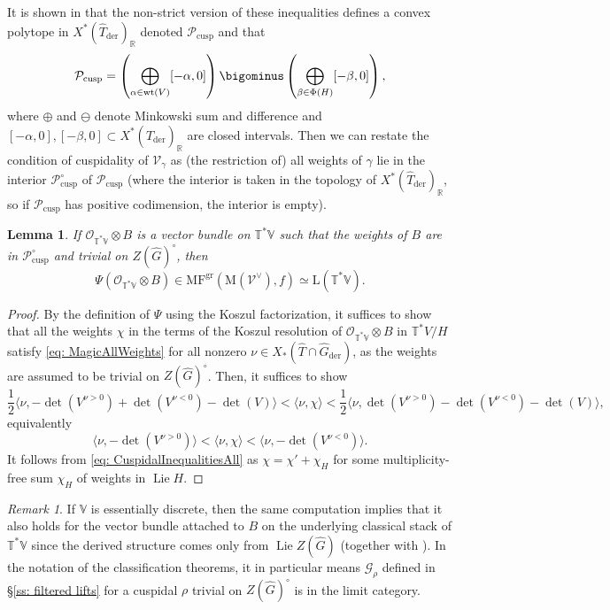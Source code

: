 \documentclass{amsart}
\newtheorem{lemma}[theorem]{Lemma}
\theoremstyle{definition}
\theoremstyle{remark}
\newtheorem{remark}[theorem]{Remark}
\numberwithin{equation}{section}
\DeclareMathOperator{\Lie}{Lie}
\newcommand{\der}{\mathrm{der}}
\newcommand{\mc}{\mathcal}
\newcommand{\R}{\mathbb{R}}
\newcommand{\wh}{\widehat}
\newcommand{\cusp}{\mathrm{cusp}}
\newcommand{\V}{\mathbb{V}}
\newcommand{\T}{\mathbb{T}}
\DeclareMathOperator{\gr}{gr}
\newcommand{\wt}{\mathrm{wt}}
\newcommand{\MF}{\mathrm{MF}}
\newcommand{\mrL}{\mathrm{L}}
\newcommand{\M}{\mathrm{M}}
\begin{document}
It is shown in \cite{BMKL} that the non-strict version of these inequalities defines a convex polytope in $X^{\ast}(\wh{T}_{\der})_{\R}$ denoted $\mc{P}_{\cusp}$ and that 
  \begin{equation*}
        \mc{P}_{\cusp} = \left(\bigoplus_{\alpha \in \wt(V)} [-\alpha, 0]\right) \bigominus \left(\bigoplus_{\beta \in \Phi(H)} [-\beta, 0]\right),
    \end{equation*}
where $\oplus$ and $\ominus$ denote Minkowski sum and difference and $[-\alpha,0], [-\beta, 0] \subset X^{\ast}(\wh{T}_{\der})_{\R}$ are closed intervals. Then we can restate the condition of cuspidality of $\mc{V}_{\gamma}$ as (the restriction of) all weights of $\gamma$ lie in the interior $\mc{P}^{\circ}_{\cusp}$ of $\mc{P}_{\cusp}$ (where the interior is taken in the topology of $X^{\ast}(\wh{T}_{\der})_{\R}$, so if $\mc{P}_{\cusp}$ has positive codimension, the interior is empty).

\begin{lemma}
If $\mc O_{\T^*\V}\otimes B$ is a vector bundle on $\T^*\V$ such that the weights of $B$ are in $\mc{P}^{\circ}_{\cusp}$ and trivial on $Z(\wh G)^\circ$, then 
\[
\Psi(\mc O_{\T^*\V}\otimes B)\in \MF^{\gr}(\M(\mc V^\vee),f )\simeq \mrL (\T^*\V).
\]
\end{lemma}

\begin{proof}
By the definition of $\Psi$ using the Koszul factorization, it suffices to show that all the weights $\chi$ in the terms of the Koszul resolution of $\mc O_{\T^*\V}\otimes B$ in $\T^*V/H$ satisfy \eqref{eq: MagicAllWeights} for all nonzero $\nu \in X_* (\wh T \cap \wh G_{\der})$, as the weights are assumed to be trivial on $Z(\wh G)^\circ$. Then, it suffices to show
\[
\frac{1}{2}\langle \nu, -\det (V^{\nu >0}) +\det (V^{\nu<0})-\det(V)\rangle
< \langle \nu, \chi \rangle 
< \frac{1}{2}\langle \nu, \det (V^{\nu >0}) -\det (V^{\nu<0})-\det(V)\rangle,
\]
equivalently
\[
\langle \nu, -\det (V^{\nu >0})\rangle
< \langle \nu, \chi \rangle 
<  \langle \nu, -\det (V^{\nu<0})\rangle. 
\]
It follows from \eqref{eq: CuspidalInequalitiesAll} as $\chi= \chi' + \chi_H$ for some multiplicity-free sum $\chi_H$ of weights in $\Lie H$. 
\end{proof}

\begin{remark}\label{rem: CuspidalSubsetLimit}
If $\V$ is essentially discrete, then the same computation implies that it also holds for the vector bundle attached to $B$ on the underlying classical stack of $\T^*\V$ since the derived structure comes only from $\Lie Z(\wh G)$ (together with \cite[Lemma 2.23]{PTqBPSsymquiverswithpotential}). In the notation of the classification theorems, it in particular means $\mc G_\rho$ defined in \S \ref{ss: filtered lifts} for a cuspidal $\rho$ trivial on $Z(\wh G)^\circ$ is in the limit category.  
\end{remark}
\end{document}
